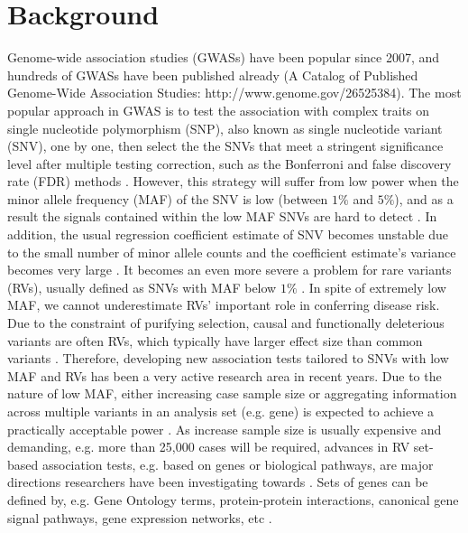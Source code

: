 \documentclass[12pt]{article}
\begin{document}
\section{Background}\label{sec:background}
\doublespacing
Genome-wide association studies (GWASs) have been popular since 2007, and hundreds of GWASs have been published already (A Catalog of Published Genome-Wide Association Studies: http://www.genome.gov/26525384). The most popular approach in GWAS is to test the association with complex traits on single nucleotide polymorphism (SNP), also known as single nucleotide variant (SNV), one by one, then select the the SNVs that meet a stringent significance level after multiple testing correction, such as the Bonferroni and false discovery rate (FDR) methods \cite{McCarthy2008,Hirschhorn2005}. However, this strategy will suffer from low power when the minor allele frequency (MAF) of the SNV is low (between $1\%$ and $5\%$), and as a result the signals contained within the low MAF SNVs are hard to detect \cite{Sham2014}. In addition, the usual regression coefficient estimate of SNV becomes unstable due to the small number of minor allele counts and the coefficient estimate's variance becomes very large \cite{Sham2014}. It becomes an even more severe a problem for rare variants (RVs), usually defined as SNVs with MAF below $1\%$ \cite{Bansal2010}. In spite of extremely low MAF, we cannot underestimate RVs' important role in conferring disease risk. Due to the constraint of purifying selection, causal and functionally deleterious variants are often RVs, which typically have larger effect size than common variants \cite{Fu2013,Bansal2010,Sham2014,McCarthy2008}. Therefore, developing new association tests tailored to SNVs with low MAF and RVs has been a very active research area in recent years. Due to the nature of low MAF, either increasing case sample size or aggregating information across multiple variants in an analysis set (e.g. gene) is expected to achieve a practically acceptable power \cite{Capanu2011,Basu2011,Bansal2010,Sham2014}. As increase sample size is usually expensive and demanding, e.g. more than 25,000 cases will be required, advances in RV set-based association tests, e.g. based on genes or biological pathways, are major directions researchers have been investigating towards \cite{Ye2011,Pinto2010,Sham2014}. Sets of genes can be defined by, e.g. Gene Ontology terms, protein-protein interactions, canonical gene signal pathways, gene expression networks, etc \cite{Sham2014,DelaCruz2010,Weng2011,Wang2010,Wei2012a}.
\end{document}
